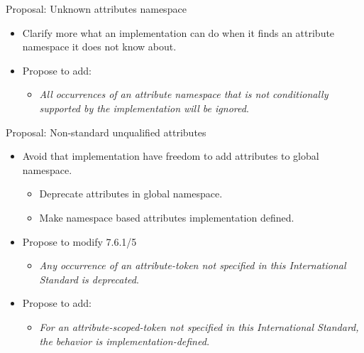 \begin{frame}[t]{Proposal: Unknown attributes namespace}
\begin{itemize}
  \item Clarify more what an implementation can do when it finds an attribute namespace
        it does not know about.

  \vfill
  \item Propose to add:
    \begin{itemize}
      \item 
\emph{All occurrences of an attribute namespace that is not conditionally supported
by the implementation will be ignored}.
    \end{itemize}
\end{itemize}
\end{frame}

\begin{frame}[t]{Proposal: Non-standard unqualified attributes}
\begin{itemize}
  \item Avoid that implementation have freedom to add attributes to global namespace.
    \begin{itemize}
      \item Deprecate attributes in global namespace.
      \item Make namespace based attributes implementation defined.
    \end{itemize}
  
  \vfill
  \item Propose to modify 7.6.1/5
    \begin{itemize}
      \item 
\emph{Any occurrence of an attribute-token not specified in this International
Standard is deprecated}.
    \end{itemize}
  \vfill
  \item Propose to add:
    \begin{itemize}
      \item 
\emph{For an attribute-scoped-token not specified in this International
Standard, the behavior is implementation-defined.}
    \end{itemize}
\end{itemize}
\end{frame}
